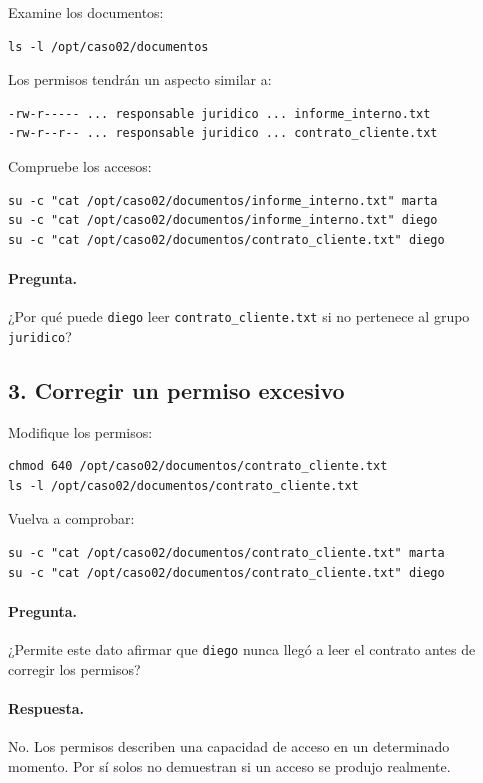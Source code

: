 Examine los documentos:
\begin{verbatim}
ls -l /opt/caso02/documentos
\end{verbatim}

Los permisos tendrán un aspecto similar a:
\begin{verbatim}
-rw-r----- ... responsable juridico ... informe_interno.txt
-rw-r--r-- ... responsable juridico ... contrato_cliente.txt
\end{verbatim}

Compruebe los accesos:
\begin{verbatim}
su -c "cat /opt/caso02/documentos/informe_interno.txt" marta
su -c "cat /opt/caso02/documentos/informe_interno.txt" diego
su -c "cat /opt/caso02/documentos/contrato_cliente.txt" diego
\end{verbatim}

\paragraph{Pregunta.}
¿Por qué puede \texttt{diego} leer \texttt{contrato\_cliente.txt} si no pertenece al grupo \texttt{juridico}?

\subsection*{3. Corregir un permiso excesivo}

Modifique los permisos:
\begin{verbatim}
chmod 640 /opt/caso02/documentos/contrato_cliente.txt
ls -l /opt/caso02/documentos/contrato_cliente.txt
\end{verbatim}

Vuelva a comprobar:
\begin{verbatim}
su -c "cat /opt/caso02/documentos/contrato_cliente.txt" marta
su -c "cat /opt/caso02/documentos/contrato_cliente.txt" diego
\end{verbatim}

\paragraph{Pregunta.}
¿Permite este dato afirmar que \texttt{diego} nunca llegó a leer el contrato antes de corregir los permisos?

\paragraph{Respuesta.}
No. Los permisos describen una capacidad de acceso en un determinado momento. Por sí solos no demuestran si un acceso se produjo realmente.

